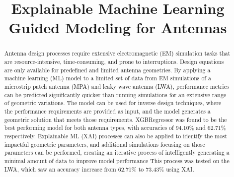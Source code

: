 \documentclass[conference]{IEEEtran}
\begin{document}
\title{Explainable Machine Learning Guided Modeling for Antennas\\
}

\author{
\and
{}
\and
{}
\and
{}
}

\maketitle

\begin{abstract}
    Antenna design processes require extensive electromagnetic (EM) simulation tasks that are resource-intensive, time-consuming, and prone to interruptions. Design equations are only available for predefined and limited antenna geometries. By applying a machine learning (ML) model to a limited set of data from EM simulations of a microstrip patch antenna (MPA) and leaky wave antenna (LWA), performance metrics can be predicted significantly quicker than running simulations for an extensive range of geometric variations. The model can be used for inverse design techniques, where the performance requirements are provided as input, and the model generates a geometric solution that meets those requirements. XGBRegressor was found to be the best performing model for both antenna types, with accuracies of 94.10\% and 62.71\% respectively. Explainable ML (XAI) processes can also be applied to identify the most impactful geometric parameters, and additional simulations focusing on those parameters can be performed, creating an iterative process of intelligently generating a minimal amount of data to improve model performance This process was tested on the LWA, which saw an accuracy increase from 62.71\% to 73.43\% using XAI. 
\end{abstract}
\end{document}
